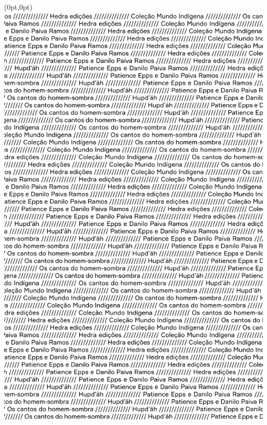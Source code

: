 \thispagestyle{empty}

\thispagestyle{empty}
\begin{textblock*}{2.625in}(0pt,0pt)%
\vspace*{-2.4cm}
\hspace*{-2.65cm}\includegraphics[width=138mm]{./MI_PAIVA_EPPS_SOMBRA_ABERTURA.png}  
\end{textblock*}
\clearpage
\pagebreak


